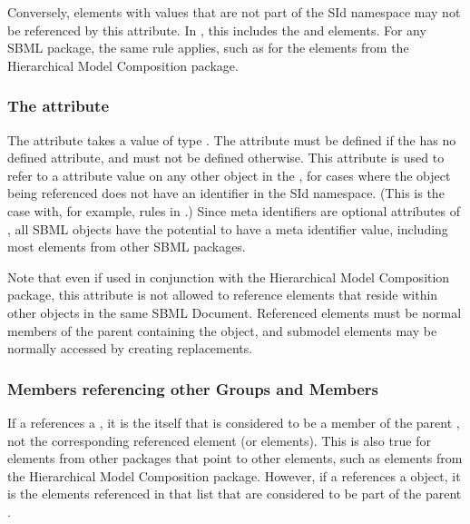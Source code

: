 Conversely, elements with  values that are not part of the SId namespace may not be referenced by this  attribute.  In \sbmlthreecore, this includes the \Unit and \LocalParameter elements.  For any SBML package, the same rule applies, such as for the \Port elements from the Hierarchical Model Composition package.


\subsubsection{The \fixttspace{} attribute}
\label{member-metaidref-attribute}

The \Member attribute  takes a value of type .  The attribute must be defined if the \Member has no defined  attribute, and must not be defined otherwise.  This attribute is used to refer to a  attribute value on any other object in the \Model, for cases where the object being referenced does not have an identifier in the \Model SId namespace.  (This is the case with, for example, rules in \sbmlthreecore.)  Since meta identifiers are optional attributes of \SBase, all SBML objects have the potential to have a meta identifier value, including most elements from other SBML packages.

Note that even if used in conjunction with the  Hierarchical Model Composition package, this attribute is not allowed to reference elements that reside within other \Model objects in the same SBML Document.  Referenced elements must be normal members of the parent \Model containing the \Member object, and submodel elements may be normally accessed by creating replacements.


\subsubsection{Members referencing other Groups and Members}
\label{nested-groups}

If a \Member references a \Group, it is the \Group itself that is considered to be a member of the parent \Group, not the corresponding referenced element (or elements).  This is also true for elements from other packages that point to other elements, such as \SBaseRef elements from the  Hierarchical Model Composition package.  However, if a \Member references a \ListOfMembers object, it is the elements referenced in that list that are considered to be part of the parent \Group.

